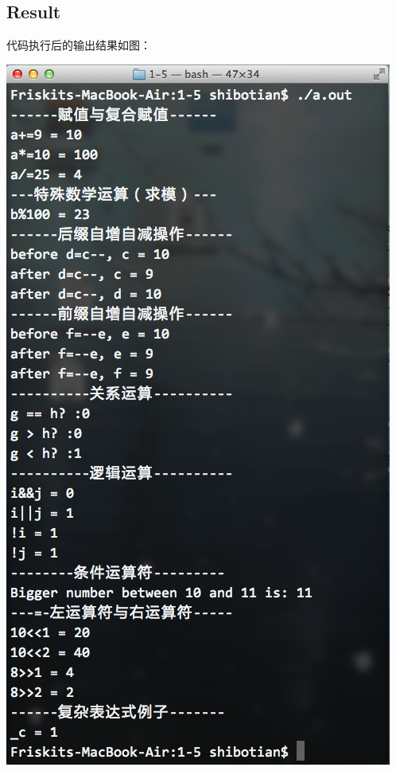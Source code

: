 \subsection{Result}
代码执行后的输出结果如图：
\\[\intextsep] 
  \begin{minipage}{\textwidth} 
    \centering 
    \includegraphics{codes/1-5/result.png}
    \label{fig:code-1-5-result} 
  \end{minipage} 
\\[\intextsep]

